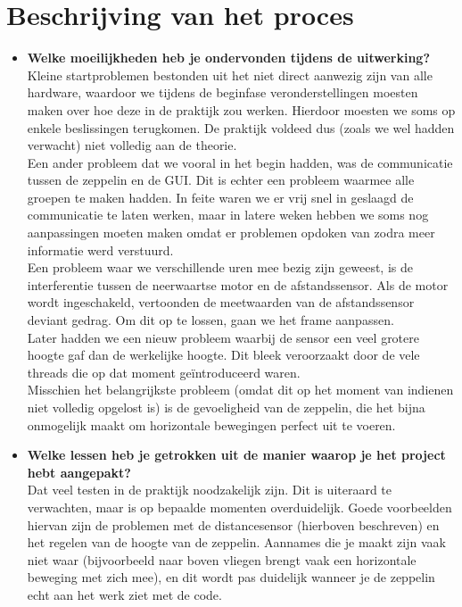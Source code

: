 \documentclass[eind]{penoverslag}
\begin{document}
\section{Beschrijving van het proces}
\begin{itemize}
\item \textbf{Welke moeilijkheden heb je ondervonden tijdens de uitwerking?} \\
Kleine startproblemen bestonden uit het niet direct aanwezig zijn van alle hardware, waardoor we tijdens de beginfase veronderstellingen moesten maken over hoe deze in de praktijk zou werken. Hierdoor moesten we soms op enkele beslissingen terugkomen. De praktijk voldeed dus (zoals we wel hadden verwacht) niet volledig aan de theorie. \\
Een ander probleem dat we vooral in het begin hadden, was de communicatie tussen de zeppelin en de GUI. Dit is echter een probleem waarmee alle groepen te maken hadden. In feite waren we er vrij snel in geslaagd de communicatie te laten werken, maar in latere weken hebben we soms nog aanpassingen moeten maken omdat er problemen opdoken van zodra meer informatie werd verstuurd. \\
Een probleem waar we verschillende uren mee bezig zijn geweest, is de interferentie tussen de neerwaartse motor en de afstandssensor. Als de motor wordt ingeschakeld, vertoonden de meetwaarden van de afstandssensor deviant gedrag. Om dit op te lossen, gaan we het frame aanpassen. \\
Later hadden we een nieuw probleem waarbij de sensor een veel grotere hoogte gaf dan de werkelijke hoogte. Dit bleek veroorzaakt door de vele threads die op dat moment ge\"introduceerd waren. \\
Misschien het belangrijkste probleem (omdat dit op het moment van indienen niet volledig opgelost is) is de gevoeligheid van de zeppelin, die het bijna onmogelijk maakt om horizontale bewegingen perfect uit te voeren.
\item \textbf{Welke lessen heb je getrokken uit de manier waarop je het project hebt aangepakt?} \\
Dat veel testen in de praktijk noodzakelijk zijn. Dit is uiteraard te verwachten, maar is op bepaalde momenten overduidelijk. Goede voorbeelden hiervan zijn de problemen met de distancesensor (hierboven beschreven) en het regelen van de hoogte van de zeppelin. Aannames die je maakt zijn vaak niet waar (bijvoorbeeld naar boven vliegen brengt vaak een horizontale beweging met zich mee), en dit wordt pas duidelijk wanneer je de zeppelin echt aan het werk ziet met de code. \\

\end{itemize}
\end{document}
